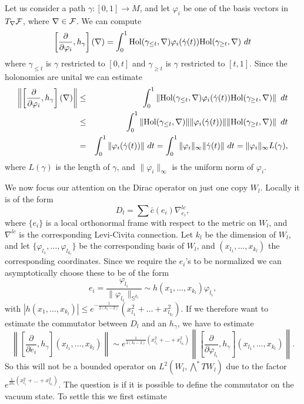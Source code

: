 \documentclass[letterpaper,12pt]{article}
\def\cf{{\cal F}}
\newcommand{\cF}{{\cal F}}
\begin{document}
Let us consider a path $\gamma :[0,1]\to M $, and let $\varphi_i$ be one of the basis vectors in $T_\nabla \cf$, where $\nabla \in \cF$. We can compute
$$\left[ \frac{\partial}{ \partial \varphi_i} , h_\gamma \right] (\nabla ) =\int_0^1 \hbox{Hol} (\gamma_{\leq t}, \nabla) \varphi_i(\dot{\gamma}(t))\hbox{Hol} (\gamma_{\geq t},\nabla )\  dt$$
where $\gamma_{\leq t}$ is $\gamma$ restricted to $[0,t]$ and $\gamma_{\geq t}$ is $\gamma$ restricted to $[t,1]$. Since the holonomies are unital we can estimate
\begin{eqnarray*}
\left\| \left[ \frac{\partial}{ \partial \varphi_i} , h_\gamma \right] (\nabla) \right\| &\leq &
\int_0^1 \left\|  \hbox{Hol} (\gamma_{\leq t}, \nabla) \varphi_i(\dot{\gamma}(t))\hbox{Hol} (\gamma_{\geq t},\nabla) \right\|\  dt \\
&\leq & \int_0^1 \left\|  \hbox{Hol} (\gamma_{\leq t}, \nabla)\| \| \varphi_i(\dot{\gamma}(t)) \| \|\hbox{Hol} (\gamma_{\geq t},\nabla) \right\|\  dt \\
&=& \int_0^1  \| \varphi_i(\dot{\gamma}(t)) \| \   dt =\int_0^1  \| \varphi_i\|_\infty \|\dot{\gamma}(t) \| \   dt  =\| \varphi_i\|_\infty L(\gamma), 
\end{eqnarray*}
where $L(\gamma)$ is the length of $\gamma$, and $\| \varphi_i\|_\infty$ is the uniform norm of $\varphi_i$.

We now focus our attention  on the Dirac operator on just one copy $W_l$. Locally it is of the form 
$$D_l=\sum \bar{c} (e_i)\nabla^{lc}_{e_i} , $$
where $\{e_i\}$ is a local orthonormal frame with respect to the metric on $W_l$, and $\nabla^{lc}$ is the corresponding Levi-Civita connection. Let $k_l$ be the dimension of $W_l$, and let $\{ \varphi_{l_1}, \ldots , \varphi_{l_{k_l}}\}$ be the corresponding basis of $W_l$, and $(x_{l_1}, \ldots , x_{k_{l}})$ the corresponding coordinates. Since we require the $e_i$'s to be normalized we can  asymptotically choose these to be of the form 
$$ e_i= \frac{\varphi_{l_i}}{\| \varphi_{l_1}\|_{\mathbb{S}^{k_l}}}\sim h(x_1,\ldots , x_{k_l}) \varphi_{l_i}    ,$$
with $|h(x_1,\ldots , x_{k_l})|\leq e^{-\frac{1}{2(k_l-2)}}(x_{l_1}^2+\ldots +x_{l_{k_l}}^2)$.
If we therefore want to estimate the commutator between $D_l$ and an $h_\gamma$, we have to estimate 
$$\left\| \left[ \frac{\partial}{ \partial e_i} , h_\gamma \right] (x_{l_1}, \ldots , x_{k_{l}}) \right\|\sim e^{\frac{1}{2(k_l-2)}(x_{l_1}^2+\ldots +x_{l_{k_l}}^2)} \left\| \left[ \frac{\partial}{ \partial \varphi_{l_i}} , h_\gamma \right] (x_{l_1}, \ldots , x_{k_{l}}) \right\| .$$
So this will not be a bounded operator on  $L^2(W_l,\bigwedge^*TW_l)$  due to the factor  $e^{\frac{1}{2k_l}(x_{l_1}^2+\ldots +x_{l_{k_l}}^2)}$. The question is if it is possible to define  the commutator on the vacuum state. To settle this we first estimate 
\end{document}
